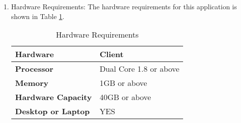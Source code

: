 \begin{enumerate}
\item Hardware Requirements: The hardware requirements for this application is shown in Table \ref{Hardware Requirements}.
\begin{table}[]
\centering
\begin{tabular}{|l|l|}
\hline
\bfseries Hardware          & Client                 \\
\hline
\bfseries Processor         & Dual Core 1.8 or above \\
\hline
\bfseries Memory            & 1GB or above           \\
\hline
\bfseries Hardware Capacity & 40GB or above          \\
\hline
\bfseries Desktop or Laptop & YES \\
\hline                   
\end{tabular}
\caption{Hardware Requirements}
\label{Hardware Requirements}
\end{table}
	\end{enumerate}
		
		
	
	
	
	
	
	
	

	
	
	


 


